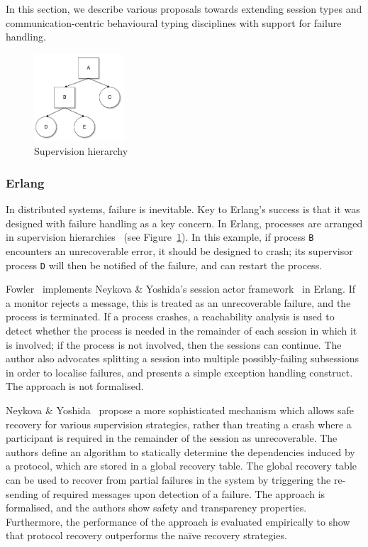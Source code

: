 \documentclass[
graybox,
envcountchap
]{svmult}
\begin{document}
\begin{bibunit}
  In this section, we describe various proposals towards extending session types
  and communication-centric behavioural typing disciplines with support for
  failure handling.

  \begin{figure}[t]
    \centering
    \includegraphics[width=0.3\textwidth]{img/SupervisionTree.pdf}
    \caption{Supervision hierarchy}
    \label{fig:bt:supervision}
  \end{figure}

  \subsubsection{Erlang}
  In distributed systems, failure is inevitable. Key to Erlang's success is that
  it was  designed with failure handling as a key concern. In Erlang, processes
  are arranged in supervision hierarchies~\cite{Armstrong03:thesis} (see
  Figure~\ref{fig:bt:supervision}). In this example, if process \texttt{B}
  encounters an unrecoverable error, it should be designed to crash; its
  supervisor process \texttt{D} will then be notified of the failure, and can
  restart the process.

  Fowler~\cite{Fowler16:actors} implements Neykova \& Yoshida's session actor
  framework~\cite{NeykovaY16:sactor} in Erlang. If a monitor rejects a message,
  this is treated as an unrecoverable failure, and the process is terminated.
  If a process crashes, a reachability analysis is used to detect whether the
  process is needed in the remainder of each session in which it is involved; if
  the process is not involved, then the sessions can continue. The author also
  advocates splitting a session into multiple possibly-failing subsessions in
  order to localise failures, and presents a simple exception handling
  construct. The approach is not formalised.

  Neykova \& Yoshida~\cite{NeykovaY17:let-it-recover} propose a more
  sophisticated mechanism which allows safe recovery for various supervision
  strategies, rather than treating a crash where a participant is required in
  the remainder of the session as unrecoverable. The authors define an algorithm
  to statically determine the dependencies induced by a protocol, which are
  stored in a global recovery table. The global recovery table can be used to
  recover from partial failures in the system by triggering the re-sending of
  required messages upon detection of a failure. The approach is formalised, and
  the authors show safety and transparency properties. Furthermore, the
  performance of the approach is evaluated empirically to show that protocol
  recovery outperforms the na\"ive recovery strategies.


\end{bibunit}
\end{document}
